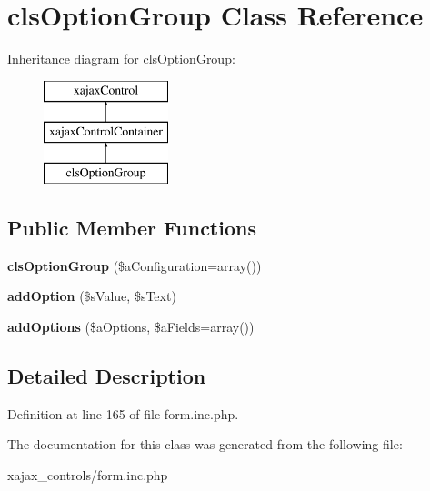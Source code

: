 \hypertarget{classclsOptionGroup}{
\section{clsOptionGroup Class Reference}
\label{classclsOptionGroup}
}
Inheritance diagram for clsOptionGroup:\begin{figure}[H]
\begin{center}
\leavevmode
\includegraphics[height=3.000000cm]{classclsOptionGroup}
\end{center}
\end{figure}
\subsection*{Public Member Functions}
\begin{DoxyCompactItemize}
\item 
\hypertarget{classclsOptionGroup_a04ee61d6695114bd4aeb5b1e12f5ef8e}{
{\bfseries clsOptionGroup} (\$aConfiguration=array())}
\label{classclsOptionGroup_a04ee61d6695114bd4aeb5b1e12f5ef8e}

\item 
\hypertarget{classclsOptionGroup_a378828b3d483488cbffa062d272db6c7}{
{\bfseries addOption} (\$sValue, \$sText)}
\label{classclsOptionGroup_a378828b3d483488cbffa062d272db6c7}

\item 
\hypertarget{classclsOptionGroup_a17498edd6e697e1359eb0f4a07cc18ca}{
{\bfseries addOptions} (\$aOptions, \$aFields=array())}
\label{classclsOptionGroup_a17498edd6e697e1359eb0f4a07cc18ca}

\end{DoxyCompactItemize}


\subsection{Detailed Description}


Definition at line 165 of file form.inc.php.



The documentation for this class was generated from the following file:\begin{DoxyCompactItemize}
\item 
xajax\_\-controls/form.inc.php\end{DoxyCompactItemize}
